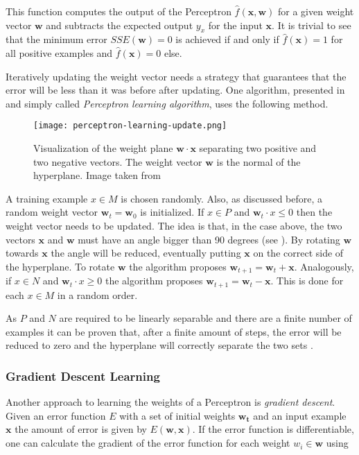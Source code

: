 This function computes the output of the Perceptron $\hat{f}(\bm{x}, \bm{w})$ for a given weight vector $\bm{w}$ and subtracts the expected output $y_x$ for the input $\bm{x}$.
It is trivial to see that the minimum error $SSE(\bm{w}) = 0$ is achieved if and only if $\hat{f}(\bm{x}) = 1$ for all positive examples and $\hat{f}(\bm{x}) = 0$ else.

Iteratively updating the weight vector needs a strategy that guarantees that the error will be less than it was before after updating.
One algorithm, presented in \cite{rojas_neural_1996} and simply called \textit{Perceptron learning algorithm}, uses the following method.

\begin{figure}[htb!]
    \centering
    \texttt{[image: perceptron-learning-update.png]}
    \caption{Visualization of the weight plane $\bm{w} \cdot \bm{x}$ separating two positive and two negative vectors. The weight vector $\bm{w}$ is the normal of the hyperplane. Image taken from \cite{rojas_neural_1996}}
    \label{fig:perceptron-learning-update}
\end{figure}

A training example $x \in M$ is chosen randomly.
Also, as discussed before, a random weight vector $\bm{w}_t = \bm{w}_0$ is initialized.
If $x \in P$ and $\bm{w}_t \cdot x \leq 0$ then the weight vector needs to be updated.
The idea is that, in the case above, the two vectors $\bm{x}$ and $\bm{w}$ must have an angle bigger than 90 degrees (see ).
By rotating $\bm{w}$ towards $\bm{x}$ the angle will be reduced, eventually putting $\bm{x}$ on the correct side of the hyperplane.
To rotate $\bm{w}$ the algorithm proposes $\bm{w}_{t+1} = \bm{w}_{t} + \bm{x}$.
Analogously, if $x \in N$ and $\bm{w}_t \cdot x \geq 0$ the algorithm proposes $\bm{w}_{t+1} = \bm{w}_{t} - \bm{x}$.
This is done for each $x \in M$ in a random order.

As $P$ and $N$ are required to be linearly separable and there are a finite number of examples it can be proven that, after a finite amount of steps, the error will be reduced to zero and the hyperplane will correctly separate the two sets \cite{rojas_neural_1996}.

\subsubsection{Gradient Descent Learning}
\label{sec:gradient_descent}
Another approach to learning the weights of a Perceptron is \textit{gradient descent}.
Given an error function $E$ with a set of initial weights $\bm{w_t}$ and an input example $\bm{x}$ the amount of error is given by $E(\bm{w}, \bm{x})$.
If the error function is differentiable, one can calculate the gradient of the error function for each weight $w_i \in \bm{w}$ using

